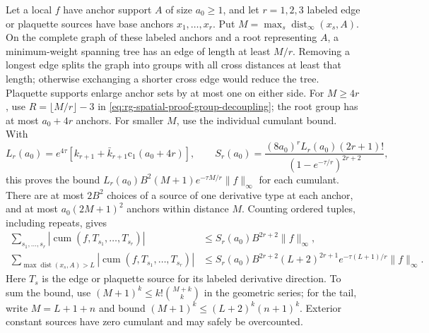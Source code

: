 Let a local \(f\) have anchor support \(A\) of size \(a_0\ge1\), and let
\(r=1,2,3\) labeled edge or plaquette sources have base anchors
\(x_1,\ldots,x_r\). Put \(M=\max_s\operatorname{dist}_\infty(x_s,A)\). On the
complete graph of these labeled anchors and a root representing \(A\), a
minimum-weight spanning tree has an edge of length at least \(M/r\).
Removing a longest edge splits the graph into groups with all cross
distances at least that length; otherwise exchanging a shorter cross edge
would reduce the tree. Plaquette supports enlarge anchor sets by at most one
on either side. For \(M\ge4r\), use \(R=\lfloor M/r\rfloor-3\) in
\cref{eq:rg-spatial-proof-group-decoupling}; the root group has at most
\(a_0+4r\) anchors. For smaller \(M\), use the individual cumulant bound.
With
\begin{equation}
 L_r(a_0)=e^{4\tau}[k_{r+1}+\bar k_{r+1}\mathrm c_1(a_0+4r)],\qquad
 S_r(a_0)=\frac{(8a_0)^rL_r(a_0)(2r+1)!}
                  {(1-e^{-\tau/r})^{2r+2}},
 \label{eq:rg-spatial-proof-response-constants}
\end{equation}
this proves the bound \(L_r(a_0)B^2(M+1)e^{-\tau M/r}\|f\|_\infty\) for
each cumulant. There are at most \(2B^2\) choices of a source of one
derivative type at each anchor, and at most \(a_0(2M+1)^2\) anchors within
distance \(M\). Counting ordered tuples, including repeats, gives
\begin{equation}
 \begin{split}
 \sum_{s_1,\ldots,s_r}|\operatorname{cum}(f,T_{s_1},\ldots,T_{s_r})|
 &\le S_r(a_0)B^{2r+2}\|f\|_\infty,\\
 \sum_{\max\operatorname{dist}(x_s,A)>L}
       |\operatorname{cum}(f,T_{s_1},\ldots,T_{s_r})|
 &\le S_r(a_0)B^{2r+2}(L+2)^{2r+1}
                     e^{-\tau(L+1)/r}\|f\|_\infty.
 \end{split}
 \label{eq:rg-spatial-proof-response-tails}
\end{equation}
Here \(T_s\) is the edge or plaquette source for its labeled derivative
direction. To sum the bound, use \((M+1)^k\le k!\binom{M+k}k\) in the
geometric series; for the tail, write \(M=L+1+n\) and bound
\((M+1)^k\le(L+2)^k(n+1)^k\). Exterior constant sources have zero cumulant
and may safely be overcounted.

